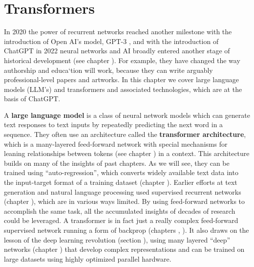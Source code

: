 \chapter{Transformers}\label{ch_transformers}


In 2020 the power of recurrent networks reached another milestone with the introduction of Open AI's model, GPT-3 \cite{brown2020language, floridi2020gpt}, and with the introduction of ChatGPT in 2022 neural networks and AI broadly entered another stage of historical development (see chapter ). For example, they have changed the way authorship and educa`tion will work, because they can write arguably professional-level papers and artworks. In this chapter we cover large language models (LLM's) and transformers and associated technologies, which are at the basis of ChatGPT.

A \textbf{large language model} is a class of neural network models which can generate text responses to text inputs by repeatedly predicting the next word in a sequence. They often use an architecture called the \textbf{transformer architecture}, which is a many-layered feed-forward network with special mechanisms for leaning relationships between tokens (see chapter ) in a context.  This architecture builds on many of the insights of past chapters. As we will see, they can be trained using ``auto-regression'', which converts widely available text data into the input-target format of a training dataset (chapter ). Earlier efforts at text generation and natural language processing used supervised recurrent networks (chapter ), which are in various ways limited. By using feed-forward networks to accomplish the same task, all the accumulated insights of decades of research could be leveraged. A transformer is in fact just a really complex feed-forward supervised network running a form of backprop (chapters , ). It also draws on the lesson of the deep learning revolution (section ), using many layered ``deep'' networks (chapter ) that develop complex representations and can be trained on large datasets using highly optimized parallel hardware.

